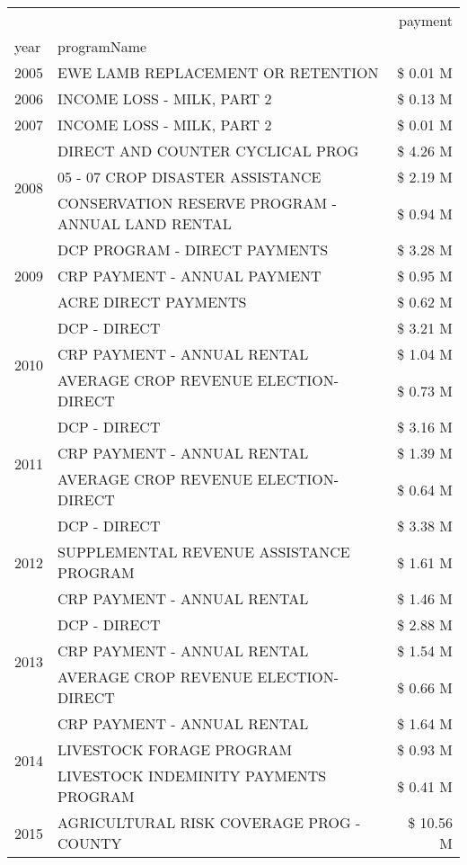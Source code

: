 \begin{tabular}{llr}
\toprule
 &  & payment \\
year & programName &  \\
\midrule
2005 & EWE LAMB REPLACEMENT OR RETENTION & \$ 0.01 M \\
\cline{1-3}
2006 & INCOME LOSS - MILK, PART 2 & \$ 0.13 M \\
\cline{1-3}
2007 & INCOME LOSS - MILK, PART 2 & \$ 0.01 M \\
\cline{1-3}
\multirow[t]{3}{*}{2008} & DIRECT AND COUNTER CYCLICAL PROG & \$ 4.26 M \\
 & 05 - 07 CROP DISASTER ASSISTANCE & \$ 2.19 M \\
 & CONSERVATION RESERVE PROGRAM - ANNUAL LAND RENTAL & \$ 0.94 M \\
\cline{1-3}
\multirow[t]{3}{*}{2009} & DCP PROGRAM - DIRECT PAYMENTS & \$ 3.28 M \\
 & CRP PAYMENT - ANNUAL PAYMENT & \$ 0.95 M \\
 & ACRE DIRECT PAYMENTS & \$ 0.62 M \\
\cline{1-3}
\multirow[t]{3}{*}{2010} & DCP - DIRECT & \$ 3.21 M \\
 & CRP PAYMENT - ANNUAL RENTAL & \$ 1.04 M \\
 & AVERAGE CROP REVENUE ELECTION-DIRECT & \$ 0.73 M \\
\cline{1-3}
\multirow[t]{3}{*}{2011} & DCP - DIRECT & \$ 3.16 M \\
 & CRP PAYMENT - ANNUAL RENTAL & \$ 1.39 M \\
 & AVERAGE CROP REVENUE ELECTION-DIRECT & \$ 0.64 M \\
\cline{1-3}
\multirow[t]{3}{*}{2012} & DCP - DIRECT & \$ 3.38 M \\
 & SUPPLEMENTAL REVENUE ASSISTANCE PROGRAM & \$ 1.61 M \\
 & CRP PAYMENT - ANNUAL RENTAL & \$ 1.46 M \\
\cline{1-3}
\multirow[t]{3}{*}{2013} & DCP - DIRECT & \$ 2.88 M \\
 & CRP PAYMENT - ANNUAL RENTAL & \$ 1.54 M \\
 & AVERAGE CROP REVENUE ELECTION-DIRECT & \$ 0.66 M \\
\cline{1-3}
\multirow[t]{3}{*}{2014} & CRP PAYMENT - ANNUAL RENTAL & \$ 1.64 M \\
 & LIVESTOCK FORAGE PROGRAM & \$ 0.93 M \\
 & LIVESTOCK INDEMINITY PAYMENTS PROGRAM & \$ 0.41 M \\
\cline{1-3}
\multirow[t]{3}{*}{2015} & AGRICULTURAL RISK COVERAGE PROG - COUNTY & \$ 10.56 M \\

\end{tabular}
